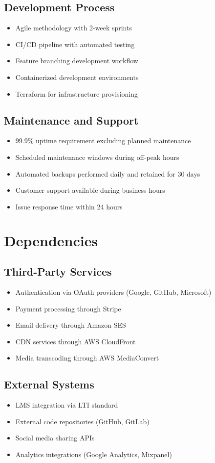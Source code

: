 \documentclass[a4paper, 11pt]{scrreprt}
\begin{document}
\subsection{Development Process}
\begin{itemize}
    \item Agile methodology with 2-week sprints
    \item CI/CD pipeline with automated testing
    \item Feature branching development workflow
    \item Containerized development environments
    \item Terraform for infrastructure provisioning
\end{itemize}

\subsection{Maintenance and Support}
\begin{itemize}
    \item 99.9\% uptime requirement excluding planned maintenance
    \item Scheduled maintenance windows during off-peak hours
    \item Automated backups performed daily and retained for 30 days
    \item Customer support available during business hours
    \item Issue response time within 24 hours
\end{itemize}

\section{Dependencies}

\subsection{Third-Party Services}
\begin{itemize}
    \item Authentication via OAuth providers (Google, GitHub, Microsoft)
    \item Payment processing through Stripe
    \item Email delivery through Amazon SES
    \item CDN services through AWS CloudFront
    \item Media transcoding through AWS MediaConvert
\end{itemize}

\subsection{External Systems}
\begin{itemize}
    \item LMS integration via LTI standard
    \item External code repositories (GitHub, GitLab)
    \item Social media sharing APIs
    \item Analytics integrations (Google Analytics, Mixpanel)
\end{itemize}
\end{document}
